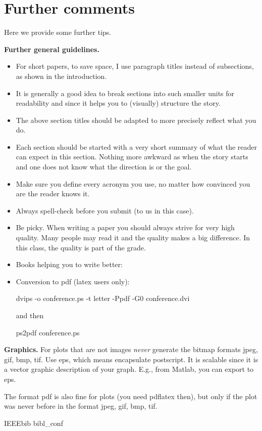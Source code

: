 \documentclass[letterpaper]{article}
\newcommand{\mypar}[1]{{\bf #1.}} %
\begin{document}
	
	
	\section{Further comments}
	
	Here we provide some further tips.
	
	\mypar{Further general guidelines}
	
	\begin{itemize}
	\item For short papers, to save space, I use paragraph titles instead of
	subsections, as shown in the introduction.
	
	\item It is generally a good idea to break sections into such smaller
	units for readability and since it helps you to (visually) structure the story.
	
	\item The above section titles should be adapted to more precisely
	reflect what you do.
	
	\item Each section should be started with a very
	short summary of what the reader can expect in this section. Nothing
	more awkward as when the story starts and one does not know what the
	direction is or the goal.
	
	\item Make sure you define every acronym you use, no matter how
	convinced you are the reader knows it.
	
	\item Always spell-check before you submit (to us in this case).
	
	\item Be picky. When writing a paper you should always strive for very
	high quality. Many people may read it and the quality makes a big difference.
	In this class, the quality is part of the grade.
	
	\item Books helping you to write better:
	
	\item Conversion to pdf (latex users only): 
	
	dvips -o conference.ps -t letter -Ppdf -G0 conference.dvi
	
	and then
	
	ps2pdf conference.ps
	\end{itemize}
	
	\mypar{Graphics} For plots that are not images {\em never} generate the bitmap formats
	jpeg, gif, bmp, tif. Use eps, which means encapsulate postscript. It is
	scalable since it is a vector graphic description of your graph. E.g.,
	from Matlab, you can export to eps.
	
	The format pdf is also fine for plots (you need pdflatex then), but only if the plot was never before in the format 
	jpeg, gif, bmp, tif.


	 	{IEEEbib} %
	 		{bibl_conf}
\end{document}

